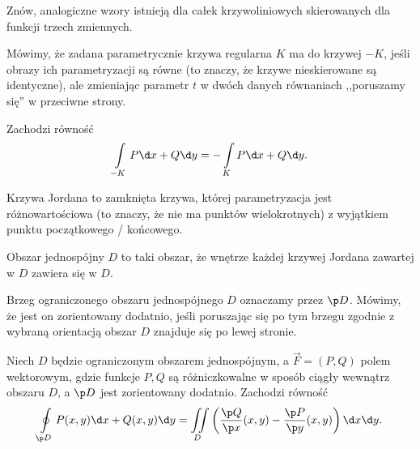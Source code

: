 Znów, analogiczne wzory istnieją dla całek krzywoliniowych skierowanych dla funkcji trzech zmiennych.

Mówimy, że zadana parametrycznie krzywa regularna $K$ ma  do krzywej $-K$, jeśli obrazy ich parametryzacji są równe (to znaczy, że krzywe nieskierowane są identyczne), ale zmieniając parametr $t$ w dwóch danych równaniach ,,poruszamy się'' w przeciwne strony.

\begin{fact}
    Zachodzi równość
    \[ \int\limits_{-K} P \d x + Q \d y = -\int\limits_K P \d x + Q \d y. \]
\end{fact}

\begin{definition}
    Krzywa Jordana to zamknięta krzywa, której parametryzacja jest różnowartościowa (to znaczy, że nie ma punktów wielokrotnych) z wyjątkiem punktu początkowego / końcowego.
\end{definition}

\begin{definition}
    Obszar jednospójny $D$ to taki obszar, że wnętrze każdej krzywej Jordana zawartej w $D$ zawiera się w $D$.
\end{definition}

Brzeg ograniczonego obszaru jednospójnego $D$ oznaczamy przez $\p D$. Mówimy, że jest on zorientowany dodatnio, jeśli poruszając się po tym brzegu zgodnie z wybraną orientacją obszar $D$ znajduje się po lewej stronie.

\begin{theorem}[Greena]
    \label{t:Green}
    Niech $D$ będzie ograniczonym obszarem jednospójnym, a $\vec{F} = (P, Q)$ polem wektorowym, gdzie funkcje $P, Q$ są różniczkowalne w sposób ciągły wewnątrz obszaru $D$, a $\p D$ jest zorientowany dodatnio. Zachodzi równość
    \[ \oint\limits_{\p D} P(x, y) \d x + Q(x, y) \d y = \iint\limits_D \left(\frac{\p Q}{\p x}(x, y) - \frac{\p P}{\p y}(x, y)\right) \d x \d y. \]
\end{theorem}

